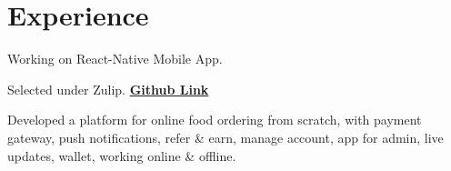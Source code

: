 \documentclass[letterpaper]{deedy-resume} %
\begin{document}
\begin{minipage}[t]{0.66\textwidth} %


\section{Experience}


\vspace{\topsep} %
\begin{tightitemize}
\item Working on React-Native Mobile App.
\end{tightitemize}

\sectionspace %


\descript{}

\begin{tightitemize}
\item Selected under Zulip. \href{https://github.com/zulip/zulip-mobile}{\bf Github Link}
\end{tightitemize}

\sectionspace %



Developed a platform for online food ordering from scratch, with payment gateway, push notifications, refer \& earn, manage account, app for admin, live updates, wallet, working online \& offline.

\sectionspace %




\end{minipage}
\end{document}

